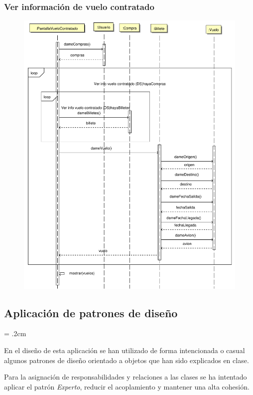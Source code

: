\documentclass[11pt, a4paper, twoside, titlepage]{article}
\begin{document}
			\subsubsection{Ver información de vuelo contratado}
				\begin{figure}[H]\centering
					\includegraphics[scale=.7]{diagramas/verinfovuelocontratado.pdf}
				\end{figure}

	\subsection{Aplicación de patrones de diseño}
		\parskip = .2cm

		En el diseño de esta aplicación \software se han utilizado de forma intencionada o casual algunos patrones de diseño orientado a objetos que han sido explicados en clase.

		Para la asignación de responsabilidades y relaciones a las clases se ha intentado aplicar el patrón \textit{Experto}, reducir el acoplamiento y 	mantener una alta cohesión.
\end{document}
